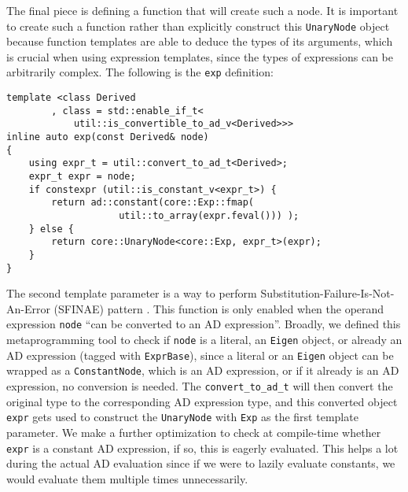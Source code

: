 The final piece is defining a function that will create such a node.
It is important to create such a function rather than explicitly
construct this \verb|UnaryNode| object because function templates
are able to deduce the types of its arguments, which is crucial when using expression templates,
since the types of expressions can be arbitrarily complex.
The following is the \verb|exp| definition:
\begin{lstlisting}[style=customcpp]
template <class Derived
        , class = std::enable_if_t<
            util::is_convertible_to_ad_v<Derived>>> 
inline auto exp(const Derived& node) 
{ 
    using expr_t = util::convert_to_ad_t<Derived>;
    expr_t expr = node;
    if constexpr (util::is_constant_v<expr_t>) { 
        return ad::constant(core::Exp::fmap(
                    util::to_array(expr.feval())) ); 
    } else { 
        return core::UnaryNode<core::Exp, expr_t>(expr); 
    } 
}
\end{lstlisting}
The second template parameter is a way to perform 
Substitution-Failure-Is-Not-An-Error (SFINAE) pattern .
This function is only enabled when the operand expression \verb|node|
``can be converted to an AD expression''.
Broadly, we defined this metaprogramming tool to check if 
\verb|node| is a literal, an \verb|Eigen| object, 
or already an AD expression (tagged with \verb|ExprBase|),
since a literal or an \verb|Eigen| object can be wrapped as a \verb|ConstantNode|,
which is an AD expression, or if it already is an AD expression, no conversion is needed.
The \verb|convert_to_ad_t| will then convert the original type to the corresponding AD expression type,
and this converted object \verb|expr| gets used 
to construct the \verb|UnaryNode| with \verb|Exp| as the first template parameter.
We make a further optimization to check at compile-time whether \verb|expr|
is a constant AD expression, if so, this is eagerly evaluated.
This helps a lot during the actual AD evaluation since if we were to lazily evaluate constants,
we would evaluate them multiple times unnecessarily.
